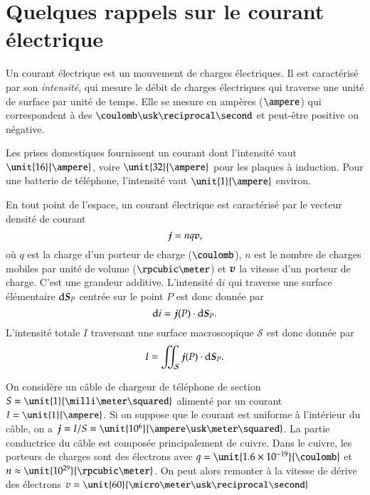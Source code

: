 \section{Quelques rappels sur le courant électrique}

\begin{defn}
Un courant électrique est un mouvement de charges électriques. Il est caractérisé 
par son \emph{intensité}, qui mesure le débit de charges électriques qui traverse
une unité de surface par unité de temps. Elle se mesure en ampères ($\ampere$)
qui correspondent à des $\coulomb \usk \reciprocal \second$ et peut-être 
positive ou négative.
\end{defn}

\begin{exemple}
	Les prises domestiques fournissent un courant dont l'intensité vaut
	$\unit{16}{\ampere}$, voire $\unit{32}{\ampere}$ pour les plaques à induction. 
	Pour une batterie de téléphone, l'intensité vaut
	$\unit{1}{\ampere}$ environ.
\end{exemple}

\begin{defn}
	En tout point de l'espace, un courant électrique est caractérisé par le vecteur 
densité de courant  
	\begin{equation}
		\vecj = n q \vecv,
		\label{eq:jnqv}
	\end{equation}
	où $q$ est la charge d'un porteur de charge ($\coulomb$), $n$ est le
	nombre de charges mobiles par unité de volume ($\rpcubic \meter$) et
	$\vecv$ la vitesse d'un porteur de charge. C'est une grandeur additive.
	L'intensité $\mathrm{d}i$
	qui traverse une surface élémentaire $\ds_P$ centrée sur le point 
	$P$ est donc donnée par 
	\begin{equation}
		\mathrm{d}i = \vecj(P) \cdot \ds_P.
	\end{equation}
	L'intensité totale $I$ traversant une surface macroscopique $\mathcal{S}$
	est donc donnée par 
	\begin{equation}
		I = \iint_\mathcal{S} \vecj(P) \cdot \ds_P.
	\end{equation}
\end{defn}

\begin{exemple}
	On considère un câble de chargeur de téléphone de section $S = \unit{1}
	{\milli \meter \squared}$ alimenté par un courant $I = \unit{1}{\ampere}$.
	Si on suppose que le courant est uniforme à l'intérieur du câble, on a
	$\vecj = I/S = \unit{10^6}{\ampere \usk \meter \squared}$. La partie 
	conductrice du câble est composée principalement de cuivre. Dans le cuivre, 
	les porteurs de charges sont des électrons avec $q = \unit{1.6 \times 10^{-19}
	}{\coulomb}$ et $n \approx \unit{10^{29}}{\rpcubic \meter}$. On peut alors remonter
	à la vitesse de dérive des électrons $v = \unit{60}
	{\micro \meter \usk \reciprocal \second}$
\end{exemple}

